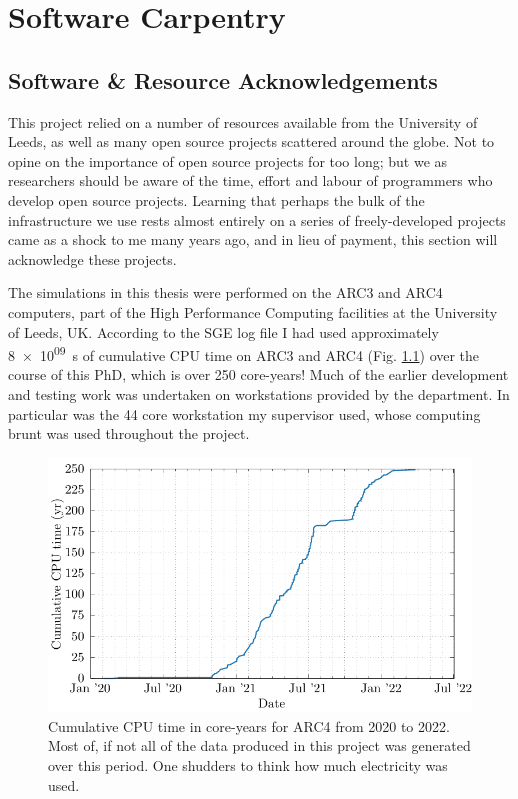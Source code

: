 \chapter{Software Carpentry}

\section{Software \& Resource Acknowledgements}

This project relied on a number of resources available from the University of Leeds, as well as many open source projects scattered around the globe.
Not to opine on the importance of open source projects for too long; but we as researchers should be aware of the time, effort and labour of programmers who develop open source projects.
Learning that perhaps the bulk of the infrastructure we use rests almost entirely on a series of freely-developed projects came as a shock to me many years ago, and in lieu of payment, this section will acknowledge these projects.

The simulations in this thesis were performed on the ARC3 and ARC4 computers, part of the High Performance Computing facilities at the University of Leeds, UK.
According to the SGE log file I had used approximately \SI{8e+09}{s} of cumulative CPU time on ARC3 and ARC4 (Fig. \ref{fig:cpugraph}) over the course of this PhD, which is over \num{250} core-years!
Much of the earlier development and testing work was undertaken on workstations provided by the department.
In particular was the 44 core workstation my supervisor used, whose computing brunt was used  throughout the project.

\begin{figure}
  \centering
  \includegraphics[]{assets/cpu_time.pdf}
  \caption[Cumulative CPU time on ARC4]{Cumulative CPU time in core-years for ARC4 from 2020 to 2022. Most of, if not all of the data produced in this project was generated over this period. One shudders to think how much electricity was used.}
  \label{fig:cpugraph}
\end{figure}

